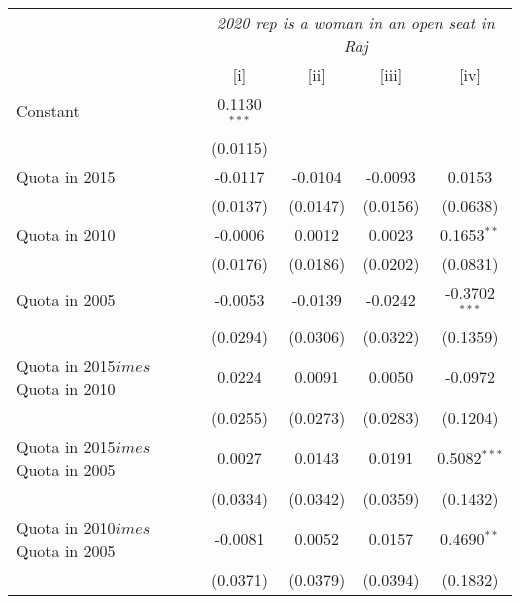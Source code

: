 
\begingroup
\centering
\begin{tabular}{lcccc}
   \toprule
    & \multicolumn{4}{c}{\textit{2020 rep is a woman in an open seat in Raj}}\\
                                                           & [i]            & [ii]          & [iii]         & [iv]\\  
   \midrule 
   Constant                                                & 0.1130$^{***}$ &               &               &   \\   
                                                           & (0.0115)       &               &               &   \\   
   Quota in 2015                                           & -0.0117        & -0.0104       & -0.0093       & 0.0153\\   
                                                           & (0.0137)       & (0.0147)      & (0.0156)      & (0.0638)\\   
   Quota in 2010                                           & -0.0006        & 0.0012        & 0.0023        & 0.1653$^{**}$\\   
                                                           & (0.0176)       & (0.0186)      & (0.0202)      & (0.0831)\\   
   Quota in 2005                                           & -0.0053        & -0.0139       & -0.0242       & -0.3702$^{***}$\\   
                                                           & (0.0294)       & (0.0306)      & (0.0322)      & (0.1359)\\   
   Quota in 2015$	imes$Quota in 2010                      & 0.0224         & 0.0091        & 0.0050        & -0.0972\\   
                                                           & (0.0255)       & (0.0273)      & (0.0283)      & (0.1204)\\   
   Quota in 2015$	imes$Quota in 2005                      & 0.0027         & 0.0143        & 0.0191        & 0.5082$^{***}$\\   
                                                           & (0.0334)       & (0.0342)      & (0.0359)      & (0.1432)\\   
   Quota in 2010$	imes$Quota in 2005                      & -0.0081        & 0.0052        & 0.0157        & 0.4690$^{**}$\\   
                                                           & (0.0371)       & (0.0379)      & (0.0394)      & (0.1832)\\   

\end{tabular}
